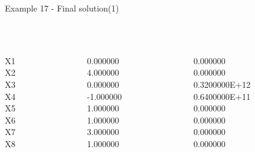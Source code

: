 \begin{frame}{Example 17 - Final solution(1)}
\footnotesize
{} \\
  \\

\begin{columns}[t]
\begin{column}{0.3\textwidth}
\\
X1\\
X2\\
X3\\
X4\\
X5\\
X6\\
X7\\
X8\\
\end{column}
\begin{column}{0.3\textwidth}
\\
0.000000\\
4.000000\\
0.000000\\
-1.000000\\
1.000000\\
1.000000\\
3.000000\\
1.000000\\
\end{column}  

\begin{column}{0.3\textwidth}
\\
0.000000\\
0.000000\\
0.3200000E+12\\
0.6400000E+11\\
0.000000\\
0.000000\\
0.000000\\
0.000000\\
\end{column}
\end{columns}
\end{frame}


